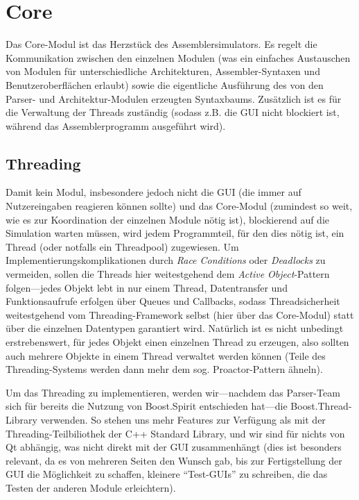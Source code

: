 \chapter{Core}

Das Core-Modul ist das Herzstück des Assemblersimulators. Es regelt die Kommunikation zwischen den einzelnen Modulen (was ein einfaches Austauschen von Modulen für unterschiedliche Architekturen, Assembler-Syntaxen und Benutzeroberflächen erlaubt) sowie die eigentliche Ausführung des von den Parser- und Architektur-Modulen erzeugten Syntaxbaums. Zusätzlich ist es für die Verwaltung der Threads zuständig (sodass z.B. die GUI nicht blockiert ist, während das Assemblerprogramm ausgeführt wird).

\section{Threading}

Damit kein Modul, insbesondere jedoch nicht die GUI (die immer auf Nutzereingaben reagieren können sollte) und das Core-Modul (zumindest so weit, wie es zur Koordination der einzelnen Module nötig ist), blockierend auf die Simulation warten müssen, wird jedem Programmteil, für den dies nötig ist, ein Thread (oder notfalls ein Threadpool) zugewiesen. Um Implementierungskomplikationen durch \textit{Race Conditions} oder \textit{Deadlocks} zu vermeiden, sollen die Threads hier weitestgehend dem \textit{Active Object}-Pattern folgen---jedes Objekt lebt in nur einem Thread, Datentransfer und Funktionsaufrufe erfolgen über Queues und Callbacks, sodass Threadsicherheit weitestgehend vom Threading-Framework selbst (hier über das Core-Modul) statt über die einzelnen Datentypen garantiert wird. Natürlich ist es nicht unbedingt erstrebenswert, für jedes Objekt einen einzelnen Thread zu erzeugen, also sollten auch mehrere Objekte in einem Thread verwaltet werden können (Teile des Threading-Systems werden dann mehr dem sog. Proactor-Pattern ähneln).

Um das Threading zu implementieren, werden wir---nachdem das Parser-Team sich für bereits die Nutzung von \textsf{Boost.Spirit} entschieden hat---die \textsf{Boost.Thread}-Library verwenden. So stehen uns mehr Features zur Verfügung als mit der Threading-Teilbiliothek der C++ Standard Library, und wir sind für nichts von Qt abhängig, was nicht direkt mit der GUI zusammenhängt (dies ist besonders relevant, da es von mehreren Seiten den Wunsch gab, bis zur Fertigstellung der GUI die Möglichkeit zu schaffen, kleinere ``Test-GUIs'' zu schreiben, die das Testen der anderen Module erleichtern).

